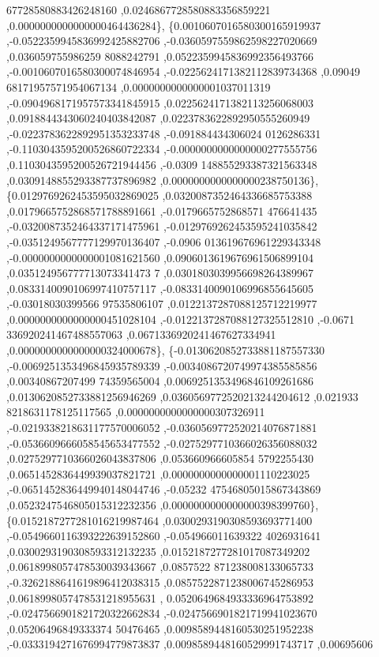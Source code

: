 \begin{DoxyCode}
      67728580883426248160 ,0.0246867728580883356859221 ,0.0000000000000000464436284\},
\{0.0010607016580300165919937 ,-0.0522359945836992425882706 ,-0.0360597559862598227020669 ,0.036059755986259
      8088242791 ,0.0522359945836992356493766 ,-0.0010607016580300074846954 ,-0.0225624171382112839734368 ,0.09049
      68171957571954067134 ,0.0000000000000001037011319 ,-0.0904968171957573341845915 ,0.0225624171382113256068003
       ,0.0918844343060240403842087 ,0.0223783622892950555260949 ,-0.0223783622892951353233748 ,-0.091884434306024
      0126286331 ,-0.1103043595200526860722334 ,-0.0000000000000000277555756 ,0.1103043595200526721944456 ,-0.0309
      148855293387321563348 ,0.0309148855293387737896982 ,0.0000000000000000238750136\},
\{0.0129769262453595032869025 ,0.0320087352464336685753388 ,0.0179665752868571788891661 ,-0.0179665752868571
      476641435 ,-0.0320087352464337171475961 ,-0.0129769262453595241035842 ,-0.0351249567777129970136407 ,-0.0906
      013619676961229343348 ,-0.0000000000000001081621560 ,0.0906013619676961506899104 ,0.035124956777713073341473
      7 ,0.0301803039956698264389967 ,0.0833140090106997410757117 ,-0.0833140090106996855645605 ,-0.03018030399566
      97535806107 ,0.0122137287088125712219977 ,0.0000000000000000451028104 ,-0.0122137287088127325512810 ,-0.0671
      336920241467488557063 ,0.0671336920241467627334941 ,0.0000000000000000324000678\},
\{-0.0130620852733881187557330 ,-0.0069251353496845935789339 ,-0.0034086720749974385585856 ,0.00340867207499
      74359565004 ,0.0069251353496846109261686 ,0.0130620852733881256946269 ,0.0360569772520213244204612 ,0.021933
      8218631178125117565 ,0.0000000000000000307326911 ,-0.0219338218631177570006052 ,-0.0360569772520214076871881
       ,-0.0536609666058545653477552 ,-0.0275297710366026356088032 ,0.0275297710366026043837806 ,0.053660966605854
      5792255430 ,0.0651452836449939037821721 ,0.0000000000000001110223025 ,-0.0651452836449940148044746 ,-0.05232
      47546805015867343869 ,0.0523247546805015312232356 ,0.0000000000000000398399760\},
\{0.0152187277281016219987464 ,0.0300293190308593693771400 ,-0.0549660116393222639152860 ,-0.054966011639322
      4026931641 ,0.0300293190308593312132235 ,0.0152187277281017087349202 ,0.0618998057478530039343667 ,0.0857522
      871238008133065733 ,-0.3262188641619896412038315 ,0.0857522871238006745286953 ,0.0618998057478531218955631 ,
      0.0520649684933336964753892 ,-0.0247566901821720322662834 ,-0.0247566901821719941023670 ,0.05206496849333374
      50476465 ,0.0098589448160530251952238 ,-0.0333194271676994779873837 ,0.0098589448160529991743717 ,0.00695606

\end{DoxyCode}
